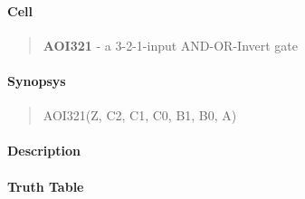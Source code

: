 \label{AOI321}
\paragraph{Cell}
\begin{quote}
    \textbf{AOI321} - a 3-2-1-input AND-OR-Invert gate
\end{quote}

\paragraph{Synopsys}
\begin{quote}
    AOI321(Z, C2, C1, C0, B1, B0, A)
\end{quote}

\paragraph{Description}



\paragraph{Truth Table}


